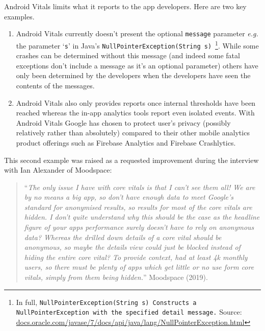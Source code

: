 Android Vitals limits what it reports to the app developers. Here are two key examples.

\begin{enumerate}
    \item Android Vitals currently doesn't present the optional \texttt{message} parameter \emph{e.g.} the parameter `\texttt{s}' in Java's \texttt{NullPointerException(String s)}~\footnote{In full, \texttt{NullPointerException(String s)
Constructs a NullPointerException with the specified detail message.} Source:  \href{https://docs.oracle.com/javase/7/docs/api/java/lang/NullPointerException.html}{docs.oracle.com/javase/7/docs/api/java/lang/NullPointerException.html}}. While some crashes can be determined without this message (and indeed some fatal exceptions don't include a message as it's an optional parameter) others have only been determined by the developers when the developers have seen the contents of the messages.
    \item Android Vitals also only provides reports once internal thresholds have been reached whereas the in-app analytics tools report even isolated events. With Android Vitals Google has chosen to protect user's privacy (possibly relatively rather than absolutely) compared to their other mobile analytics product offerings such as Firebase Analytics and Firebase Crashlytics.
\end{enumerate}

This second example was raised as a requested improvement during the interview with Ian Alexander of Moodspace:
\begin{quote}
    ``\emph{The only issue I have with core vitals is that I can't see them all! We are by no means a big app, so don't have enough data to meet Google's standard for anonymised results, so results for most of the core vitals are hidden. I don't quite understand why this should be the case as the headline figure of your apps performance surely doesn't have to rely on anonymous data? Whereas the drilled down details of a core vital should be anonymous, so maybe the details view could just be blocked instead of hiding the entire core vital? To provide context,  had at least 4k monthly users, so there must be plenty of apps which get little or no use form core vitals, simply from them being hidden.}'' Moodspace (2019).
\end{quote}

